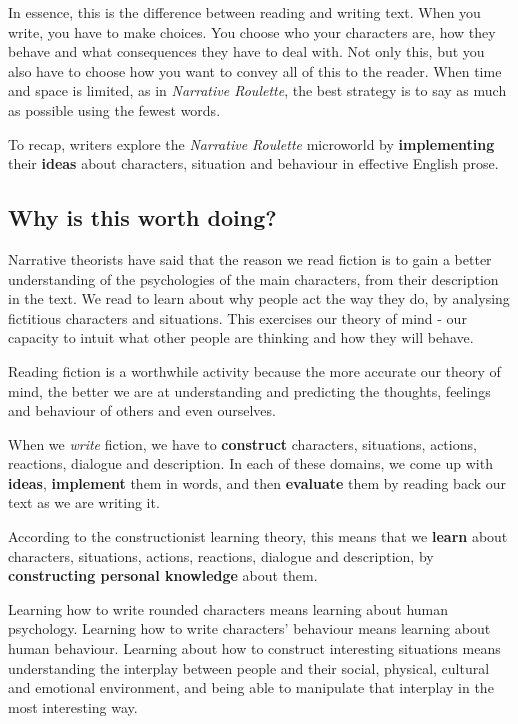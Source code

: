In essence, this is the difference between reading and writing text.
When you write, you have to make choices. You choose who your characters
are, how they behave and what consequences they have to deal with. Not
only this, but you also have to choose how you want to convey all of
this to the reader. When time and space is limited, as in
\emph{Narrative Roulette}, the best strategy is to say as much as
possible using the fewest words.

To recap, writers explore the \emph{Narrative Roulette} microworld by
\textbf{implementing} their \textbf{ideas} about characters, 
situation and behaviour in effective English prose.

\subsection{Why is this worth doing?}

Narrative theorists have said that the reason we read fiction is to gain
a better understanding of the psychologies of the main characters, from
their description in the text\cite{zunshine}. We read to learn about why
people act the way they do, by analysing fictitious characters and
situations. This exercises our theory of mind - our capacity to intuit
what other people are thinking and how they will behave.

Reading fiction is a worthwhile activity because the more accurate our
theory of mind, the better we are at understanding and predicting the
thoughts, feelings and behaviour of others and even ourselves.

When we \emph{write} fiction, we have to \textbf{construct} characters,
situations, actions, reactions, dialogue and description. In each of
these domains, we come up with \textbf{ideas}, \textbf{implement} them in
words, and then \textbf{evaluate} them by reading back our text as we
are writing it.

According to the constructionist learning theory, this means that we
\textbf{learn} about characters, situations, actions, reactions, dialogue and
description, by \textbf{constructing personal knowledge} about them. 

Learning how to write rounded characters means learning
about human psychology. Learning how to write characters' behaviour
means learning about human behaviour. Learning about how to construct
interesting situations means understanding the interplay between people
and their social, physical, cultural and emotional environment, and
being able to manipulate that interplay in the most interesting way.


